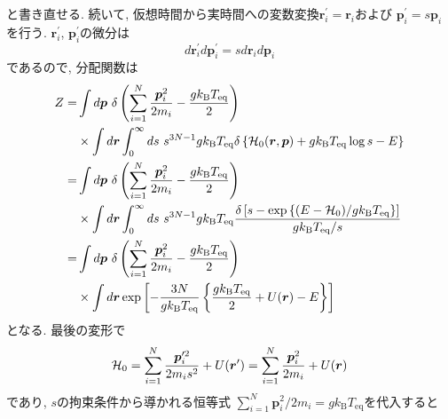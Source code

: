 と書き直せる.
続いて, 仮想時間から実時間への変数変換$\bm{r}_{i}^{\prime} = \bm{r}_{i}$および
$\bm{p}_{i}^{\prime} = s \bm{p}_{i}$を行う.
$\bm{r}_{i}^{\prime}$, $\bm{p}_{i}^{\prime}$の微分は
\begin{equation}
    d \bm{r}_{i}^{\prime} d \bm{p}_{i}^{\prime}
    =
    s d\bm{r}_{i} d \bm{p}_{i}
\end{equation}
であるので, 分配関数は
\begin{align}
    Z
    = &
    \int d\bm{p}~
    \delta
    \left(
        \sum_{i=1}^{N} \frac{\bm{p}_{i}^{2}}{2m_{i}}
        -
        \frac{g k_{\mathrm{B}} T_{\mathrm{eq}}}{2}
    \right)
    \notag \\
    &\times
    \int d\bm{r}
    \int_{0}^{\infty} ds~ s^{3N-1}
    g k_{\mathrm{B}} T_{\mathrm{eq}}
    \delta
    \left\{
        \mathcal{H}_{0}(\bm{r}, \bm{p})
        +
        g k_{\mathrm{B}} T_{\mathrm{eq}} \log s
        -
        E
    \right\}
    \notag \\
    = &
    \int d\bm{p}~
    \delta
    \left(
        \sum_{i=1}^{N} \frac{\bm{p}_{i}^{2}}{2m_{i}}
        -
        \frac{g k_{\mathrm{B}} T_{\mathrm{eq}}}{2}
    \right)
    \notag \\
    &\times
    \int d\bm{r}
    \int_{0}^{\infty} ds~ s^{3N-1}
    g k_{\mathrm{B}} T_{\mathrm{eq}}
    \frac
    {
        \delta
        \left[s - \exp\left\{(E-\mathcal{H}_{0})/g k_{\mathrm{B}} T_{\mathrm{eq}} \right\}\right]
    }
    {
        g k_{\mathrm{B}} T_{\mathrm{eq}} / s
    }
    \notag \\
    = &
    \int d\bm{p}~
    \delta
    \left(
        \sum_{i=1}^{N} \frac{\bm{p}_{i}^{2}}{2m_{i}}
        -
        \frac{g k_{\mathrm{B}} T_{\mathrm{eq}}}{2}
    \right)
    \notag \\
    &\times
    \int d\bm{r}
    \exp
    \left[
        -\frac{3N}{g k_{\mathrm{B}} T_{\mathrm{eq}}}
        \left\{
            \frac{g k_{\mathrm{B}} T_{\mathrm{eq}}}{2}
            +
            U(\bm{r})
            -
            E
        \right\}
    \right]
\end{align}
となる. 最後の変形で
\begin{equation}
    \mathcal{H}_{0}
    =
    \sum_{i=1}^{N}
    \frac{\bm{p}_{i}^{\prime 2}}{2 m_{i} s^{2}}
    +
    U(\bm{r}^{\prime})
    =
    \sum_{i=1}^{N}
    \frac{\bm{p}_{i}^{2}}{2m_{i}}
    +
    U(\bm{r})
    \notag
\end{equation}
であり, $s$の拘束条件から導かれる恒等式
$\sum_{i=1}^{N} \bm{p}_{i}^{2}/ 2m_{i} = g k_{\mathrm{B}} T_{\mathrm{eq}}$を代入すると
